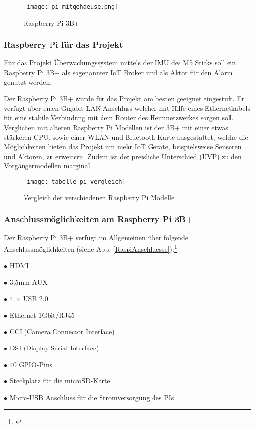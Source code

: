 	\begin{figure}[H]
	\centering
	\texttt{[image: pi\_mitgehaeuse.png]}
	\caption{Raspberry Pi 3B+}
	\label{pi_mitgehaeuse}
\end{figure}	

\subsubsection{Raspberry Pi für das Projekt}
Für das Projekt Überwachungssystem mittels der IMU des M5 Sticks soll ein 
Raspberry Pi 3B+ als sogenannter IoT Broker und als Aktor für den Alarm genutzt werden.\par
Der Raspberry Pi 3B+ wurde für das Projekt am besten geeignet eingestuft. Er verfügt über einen Gigabit-LAN Anschluss welcher mit Hilfe eines Ethernetkabels für eine stabile Verbindung mit dem Router des Heimnetzwerkes sorgen soll. Verglichen mit älteren Raspberry Pi Modellen ist der 3B+ mit einer etwas stärkeren CPU, sowie einer WLAN und Bluetooth Karte ausgestattet, welche die Möglichkeiten bieten das Projekt um mehr IoT Geräte, beispielsweise Sensoren und Aktoren, zu erweitern. Zudem ist der preisliche Unterschied (UVP) zu den Vorgängermodellen marginal.  

	\begin{figure}[H]
	\centering
	\texttt{[image: tabelle\_pi\_vergleich]}
	\caption{Vergleich der verschiedenen Raspberry Pi Modelle \protect\cite[S. 59]{Huwe.2019}}
	\label{tabelle_pi_vergleich}
\end{figure}

\subsubsection{Anschlussmöglichkeiten am Raspberry Pi 3B+}
Der Raspberry Pi 3B+ verfügt im Allgemeinen über folgende Anschlussmöglichkeiten (siehe Abb. \ref{RaspiAnschluesse}):\footnote{\cite[S. 60]{Huwe.2019}}\par 
$\bullet$ HDMI   \par %
$\bullet$ 3,5mm AUX\par 
$\bullet$ 4 $\times$ USB 2.0 \par 
$\bullet$ Ethernet 1Gbit/RJ45\par 
$\bullet$ CCI (Camera Connector Interface)\par 
$\bullet$ DSI (Display Serial Interface)\par
$\bullet$ 40 GPIO-Pins\par
$\bullet$ Steckplatz für die microSD-Karte\par
$\bullet$ Micro-USB Anschluss für die Stromversorgung des PIs\par

